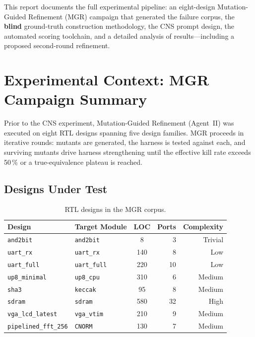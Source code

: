 \documentclass[11pt,a4paper]{article}
\begin{document}
This report documents the full experimental pipeline: an eight-design
Mutation-Guided Refinement (MGR) campaign that generated the failure corpus, the
\textbf{blind} ground-truth construction methodology, the CNS prompt design,
the automated scoring toolchain, and a detailed analysis of results---including
a proposed second-round refinement.

\section{Experimental Context: MGR Campaign Summary}

Prior to the CNS experiment, Mutation-Guided Refinement (Agent~II) was executed
on eight RTL designs spanning five design families. MGR proceeds in iterative
rounds: mutants are generated, the harness is tested against each, and
surviving mutants drive harness strengthening until the effective kill rate
exceeds 50\,\% or a true-equivalence plateau is reached.

\subsection{Designs Under Test}

\begin{table}[H]
\centering
\caption{RTL designs in the MGR corpus.}
\label{tab:designs}
\begin{tabular}{llcrr}
\toprule
\textbf{Design} & \textbf{Target Module} & \textbf{LOC} &
  \textbf{Ports} & \textbf{Complexity} \\
\midrule
\texttt{and2bit}            & \texttt{and2bit}     &  8   & 3  & Trivial \\
\texttt{uart\_rx}           & \texttt{uart\_rx}    & 140  & 8  & Low \\
\texttt{uart\_full}         & \texttt{uart\_full}  & 220  & 10 & Low \\
\texttt{up8\_minimal}       & \texttt{up8\_cpu}    & 310  & 6  & Medium \\
\texttt{sha3}               & \texttt{keccak}      & 95   & 8  & Medium \\
\texttt{sdram}              & \texttt{sdram}       & 580  & 32 & High \\
\texttt{vga\_lcd\_latest}   & \texttt{vga\_vtim}   & 210  & 9  & Medium \\
\texttt{pipelined\_fft\_256}& \texttt{CNORM}       & 130  & 7  & Medium \\
\bottomrule
\end{tabular}
\end{table}
\end{document}
